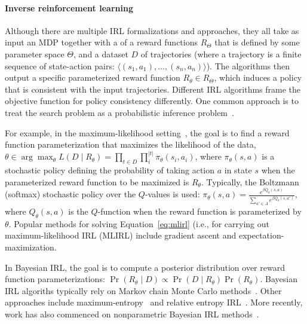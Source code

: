 
\vspace{\up}
\paragraph{Inverse reinforcement learning}

Although there are multiple IRL formalizations and approaches, they
all take as input an MDP together with a  of a reward
functions $R_\Theta$ that is defined by some parameter space $\Theta$,
and a dataset $D$ of trajectories (where a trajectory is a finite
sequence of state-action pairs: $\langle (s_1, a_1), ..., (s_n, a_n)
\rangle$). The algorithms then output a specific parameterized reward
function $R_\theta \in R_\Theta$, which induces a policy that is
consistent with the input trajectories.
%
Different IRL algorithms frame the objective function for policy
consistency differently. One common approach is to treat the
search problem as a probabilistic inference
problem~\cite{babes11,lopes2009active,ramachandran2007bayesian,ziebart2008maximum}. 

For example, in the maximum-likelihood setting~\cite{babes11}, the
goal is to find a reward function parameterization that maximizes
the likelihood of the data,
%
$\theta \in \arg\max_{\theta} L(D \mid R_{\theta}) = \prod_{t \in D} \prod_i^{|t|} \pi_{\theta}(s_i, a_i)$,
%
where $\pi_{\theta}(s, a)$ is a stochastic policy defining the
probability of taking action $a$ in state $s$ when the parameterized
reward function to be maximized is $R_{\theta}$. Typically, the
Boltzmann (softmax) stochastic policy over the $Q$-values is used:
$\pi_{\theta}(s, a) = \frac{e^{\beta Q_{\theta}(s,a)}}{\sum_{a' \in A}
  e^{\beta Q_{\theta}(s,a')}}$, where $Q_\theta(s, a)$ is the $Q$-function
when the reward function is parameterized by $\theta$.
%
Popular methods for solving Equation~\ref{eq:mlirl} (i.e., for
carrying out maximum-likelihood IRL (MLIRL) include gradient ascent
and expectation-maximization.

In Bayesian IRL, the goal is to compute a posterior distribution over
reward function parameterizations:
%
$\Pr(R_{\theta} \mid D) \propto \Pr(D \mid R_{\theta}) \Pr(R_\theta)$.
%
Bayesian IRL algoriths typically rely on Markov chain Monte Carlo
methods~\cite{journals/corr/abs-1208-2112,ramachandran2007bayesian}.
%
Other approaches include maximum-entropy~\cite{ziebart2008maximum}
and relative entropy IRL~\cite{BoulariasKP2011}. 
%
More recently, work has also commenced on
nonparametric Bayesian IRL methods~\cite{Choi:2012:NBI:2999134.2999169,Michini2012}.

